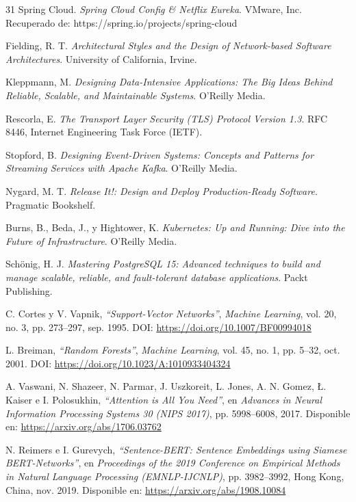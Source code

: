 \begin{thebibliography}{31}
Spring Cloud. \textit{Spring Cloud Config \& Netflix Eureka}. VMware, Inc. Recuperado de: https://spring.io/projects/spring-cloud

Fielding, R. T. \textit{Architectural Styles and the Design of Network-based Software Architectures}. University of California, Irvine.

Kleppmann, M. \textit{Designing Data-Intensive Applications: The Big Ideas Behind Reliable, Scalable, and Maintainable Systems}. O'Reilly Media.

Rescorla, E. \textit{The Transport Layer Security (TLS) Protocol Version 1.3}. RFC 8446, Internet Engineering Task Force (IETF).

Stopford, B. \textit{Designing Event-Driven Systems: Concepts and Patterns for Streaming Services with Apache Kafka}. O'Reilly Media.

Nygard, M. T. \textit{Release It!: Design and Deploy Production-Ready Software}. Pragmatic Bookshelf.

Burns, B., Beda, J., y Hightower, K. \textit{Kubernetes: Up and Running: Dive into the Future of Infrastructure}. O'Reilly Media.

Schönig, H. J. \textit{Mastering PostgreSQL 15: Advanced techniques to build and manage scalable, reliable, and fault-tolerant database applications}. Packt Publishing.

C. Cortes y V. Vapnik, \textit{``Support-Vector Networks''}, \textit{Machine Learning}, vol. 20, no. 3, pp. 273--297, sep. 1995. DOI: \url{https://doi.org/10.1007/BF00994018}
 
L. Breiman, \textit{``Random Forests''}, \textit{Machine Learning}, vol. 45, no. 1, pp. 5--32, oct. 2001. DOI: \url{https://doi.org/10.1023/A:1010933404324}
 
A. Vaswani, N. Shazeer, N. Parmar, J. Uszkoreit, L. Jones, A. N. Gomez, Ł. Kaiser e I. Polosukhin, \textit{``Attention is All You Need''}, en \textit{Advances in Neural Information Processing Systems 30 (NIPS 2017)}, pp. 5998--6008, 2017. Disponible en: \url{https://arxiv.org/abs/1706.03762}
 
N. Reimers e I. Gurevych, \textit{``Sentence-BERT: Sentence Embeddings using Siamese BERT-Networks''}, en \textit{Proceedings of the 2019 Conference on Empirical Methods in Natural Language Processing (EMNLP-IJCNLP)}, pp. 3982--3992, Hong Kong, China, nov. 2019. Disponible en: \url{https://arxiv.org/abs/1908.10084}
 

\end{thebibliography}
